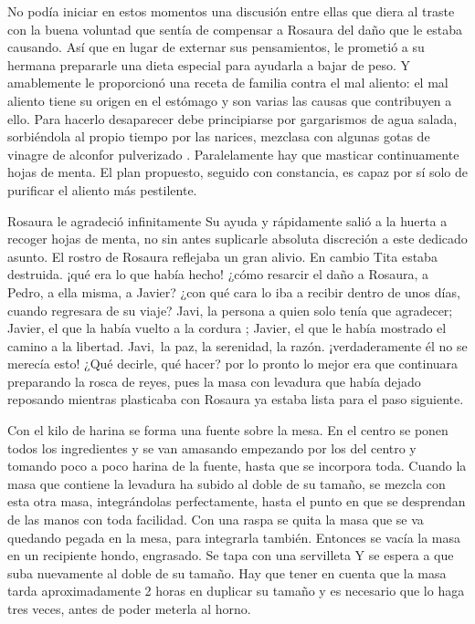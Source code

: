 No podía iniciar en estos momentos una discusión entre ellas que diera
al traste con la buena voluntad que sentía de compensar a Rosaura del
daño que le estaba causando. Así que en lugar de externar sus
pensamientos, le prometió a su hermana prepararle una dieta especial
para ayudarla a bajar de peso. Y amablemente le proporcionó una receta
de familia contra el mal aliento: \glqq{}el mal aliento tiene su origen en el
estómago y son varias las causas que contribuyen a ello. Para hacerlo
desaparecer debe principiarse por gargarismos de agua salada,
sorbiéndola al propio tiempo por las narices, mezclasa con algunas gotas
de vinagre de alconfor pulverizado . Paralelamente hay que masticar
continuamente hojas de menta. El plan propuesto, seguido con constancia,
es capaz por sí solo de purificar el aliento más pestilente\grqq{}.

Rosaura le agradeció infinitamente Su ayuda y rápidamente salió a la
huerta a recoger hojas de menta, no sin antes suplicarle absoluta
discreción a este dedicado asunto. El rostro de Rosaura reflejaba un
gran alivio. En cambio Tita estaba destruida. ¡qué era lo que había
hecho! ¿cómo resarcir el daño a Rosaura, a Pedro, a ella misma, a
Javier? ¿con qué cara lo iba a recibir dentro de unos días, cuando
regresara de su viaje? Javi, la persona a quien solo tenía que
agradecer; Javier, el que la había vuelto a la cordura ; Javier, el que
le había mostrado el camino a la libertad.
Javi,~la paz, la serenidad, la razón. ¡verdaderamente él no se
merecía esto! ¿Qué decirle, qué hacer? por lo pronto lo mejor era que
continuara preparando la rosca de reyes, pues la masa con levadura que
había dejado reposando mientras plasticaba con Rosaura ya estaba lista
para el paso siguiente.

Con el kilo de harina se forma una fuente sobre la mesa. En el centro
se ponen todos los ingredientes y se van amasando empezando por los del
centro y tomando poco a poco harina de la fuente, hasta que se incorpora
toda. Cuando la masa que contiene la levadura ha subido al doble de su
tamaño, se mezcla con esta otra masa, integrándolas perfectamente, hasta
el punto en que se desprendan de las manos con toda facilidad. Con una
raspa se quita la masa que se va quedando pegada en la mesa, para
integrarla también. Entonces se vacía la masa en un recipiente hondo,
engrasado. Se tapa con una servilleta Y se espera a que suba nuevamente
al doble de su tamaño. Hay que tener en cuenta que la masa tarda
aproximadamente 2 horas en duplicar su tamaño y es necesario que lo haga
tres veces, antes de poder meterla al horno.

